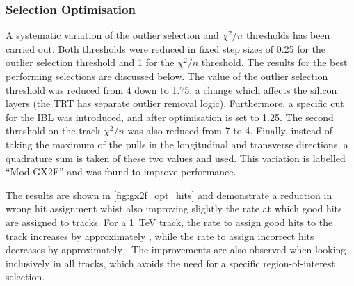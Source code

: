 \subsubsection{Selection Optimisation}

A systematic variation of the outlier selection and $\chi^2/n$ thresholds has been carried out.
Both thresholds were reduced in fixed step sizes of 0.25 for the outlier selection threshold and 1 for the $\chi^2/n$ threshold.
The results for the best performing selections are discussed below.
The value of the outlier selection threshold was reduced from 4 down to 1.75, a change which affects the silicon layers (the TRT has separate outlier removal logic).
Furthermore, a specific cut for the IBL was introduced, and after optimisation is set to 1.25.
The second threshold on the track $\chi^2/n$ was also reduced from 7 to 4.
Finally, instead of taking the maximum of the pulls in the longitudinal and transverse directions, a quadrature sum is taken of these two values and used.
This variation is labelled ``Mod GX2F'' and was found to improve performance.

The results are shown in \cref{fig:gx2f_opt_hits} and demonstrate a reduction in wrong hit assignment whist also improving slightly the rate at which good hits are assigned to tracks.
For a \SI{1}{\TeV} track, the rate to assign good hits to the track increases by approximately , while the rate to assign incorrect hits decreases by approximately .
The improvements are also observed when looking inclusively in all tracks, which avoids the need for a specific \bjet region-of-interest selection.

